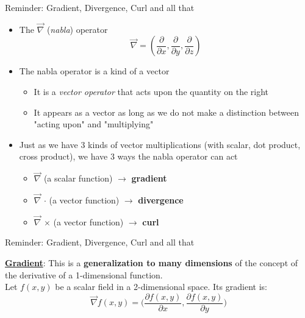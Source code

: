 {
\reminderslide

%
%
%

\begin{frame}{Reminder: Gradient, Divergence, Curl and all that}

\begin{itemize}
  \item The $\vec\nabla$ ({\em nabla}) operator
    \begin{equation*}
       \vec{\nabla} = (\frac{\partial}{\partial x}, \frac{\partial}{\partial y}, \frac{\partial}{\partial z})
    \end{equation*}
  \item The nabla operator is a kind of a vector
    \begin{itemize}
        \item It is a {\em vector operator} that acts upon the quantity on the right
        \item It appears as a vector as long as we do not make a distinction between "acting upon" and "multiplying"
    \end{itemize}
  \vspace{0.3cm}
  \item Just as we have 3 kinds of vector multiplications (with scalar, dot product, cross product),
        we have 3 ways the nabla operator can act
    \begin{itemize}
       \item $\vec\nabla$ (a scalar function) $\rightarrow$ {\bf gradient}
       \item $\vec\nabla$ $\cdot$ (a vector function) $\rightarrow$ {\bf divergence}
       \item $\vec\nabla$ $\times$ (a vector function) $\rightarrow$ {\bf curl}
    \end{itemize}
\end{itemize}

\end{frame}


%
%
%

\begin{frame}{Reminder: Gradient, Divergence, Curl and all that}

\underline{\bf Gradient}:
This is a {\bf generalization to many dimensions} of the concept of the derivative of a 1-dimensional function.\\
\vspace{0.1cm}
Let $f(x,y)$ be a scalar field in a 2-dimensional space. Its gradient is:
\begin{equation*}
   \vec\nabla f(x,y) =
     \Big(
       \frac{\partial f(x,y)}{\partial x},
       \frac{\partial f(x,y)}{\partial y}
     \Big)
\end{equation*}


\end{frame}}
